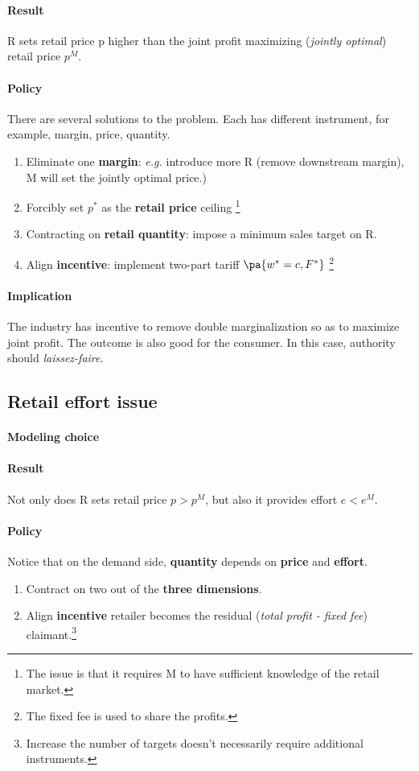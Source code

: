 \paragraph{Result} R sets retail price p higher than the joint profit maximizing (\textit{jointly optimal}) retail price $p^M$.

\paragraph{Policy} There are several solutions to the problem. Each has different instrument, for example, margin, price, quantity.
\begin{enumerate}
    \item Eliminate one \textbf{margin}: \emph{e.g.} introduce more R (remove downstream margin), M will set the jointly optimal price.)
    \item Forcibly set $p^*$ as the \textbf{retail price} ceiling \footnote{The issue is that it requires M to have sufficient knowledge of the retail market.}
    \item Contracting on \textbf{retail quantity}: impose a minimum sales target on R.
    \item Align \textbf{incentive}: implement two-part tariff $\pa{w^*=c, F^*}$ \footnote{The fixed fee is used to share the profits.}
\end{enumerate}

\paragraph{Implication} The industry has incentive to remove double marginalization so as to maximize joint profit. The outcome is also good for the consumer. In this case, authority should \textit{laissez-faire}.

\subsection{Retail effort issue}
\paragraph{Modeling choice}
\paragraph{Result} Not only does R sets retail price $p>p^M$, but also it provides effort $e<e^M$.
\paragraph{Policy} Notice that on the demand side, \textbf{quantity} depends on \textbf{price} and \textbf{effort}. 
\begin{enumerate}
    \item Contract on two out of the \textbf{three dimensions}.
    \item Align \textbf{incentive} retailer becomes the residual (\textit{total profit - fixed fee}) claimant.\footnote{Increase the number of targets doesn't necessarily require additional instruments.}
\end{enumerate}
